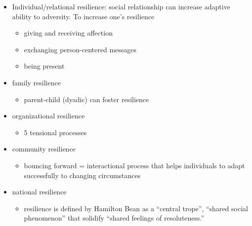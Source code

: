 \documentclass[
]{book}
\providecommand{\tightlist}{%
  \setlength{\itemsep}{0pt}\setlength{\parskip}{0pt}}
\begin{document}
\begin{itemize}
\item
  Individual/relational resilience: social relationship can increase adaptive ability to adversity. To increase one's resilience

  \begin{itemize}
  \item
    giving and receiving affection
  \item
    exchanging person-centered messages
  \item
    being present
  \end{itemize}
\item
  family resilience

  \begin{itemize}
  \tightlist
  \item
    parent-child (dyadic) can foster resilience
  \end{itemize}
\item
  organizational resilience

  \begin{itemize}
  \tightlist
  \item
    5 tensional processes
  \end{itemize}
\item
  community resilience

  \begin{itemize}
  \tightlist
  \item
    bouncing forward = interactional process that helps individuals to adapt successfully to changing circumstances
  \end{itemize}
\item
  national resilience

  \begin{itemize}
  \tightlist
  \item
    resilience is defined by Hamilton Bean as a ``central trope'', ``shared social phenomenon'' that solidify ``shared feelings of resoluteness.''
  \end{itemize}
\end{itemize}

\citep{Kam_2018}
\end{document}
